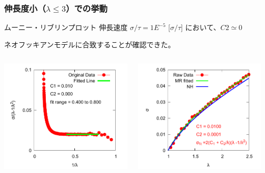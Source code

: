 \documentclass[11pt, dvipdfmx]{beamer}
\begin{document}
\begin{frame}
\frametitle{伸長度小（$\lambda \leq 3$）での挙動}

\small
\begin{alertblock}{ムーニー・リブリンプロット}
伸長速度 $\sigma/\tau = 1E^{-5}$ [$\sigma/\tau$] において、$C2 \simeq 0$

ネオフッキアンモデルに合致することが確認できた。
\end{alertblock}

\begin{columns}[T, totalwidth=0.96\linewidth]

\includegraphics[width=\columnwidth]{./fig/MR_1e-5.pdf}

\includegraphics[width=\columnwidth]{./fig/SS_w_MR_1e-5.pdf}
\end{columns}
\end{frame}
\end{document}
